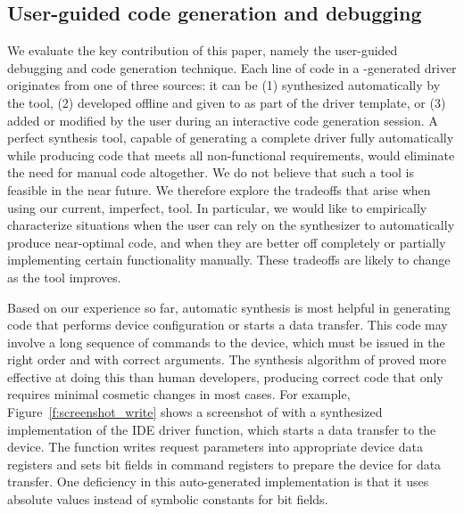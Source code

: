 
\subsection{User-guided code generation and debugging} 
We evaluate the key contribution of this paper, namely the user-guided debugging and code generation technique.  Each line of code in a \termite-generated driver originates from one of three sources: it can be (1) synthesized automatically by the tool, (2) developed offline and given to \termite as part of the driver template, or (3) added or modified by the user during an interactive code generation session.  A perfect synthesis tool, capable of generating a complete driver fully automatically while producing code that meets all non-functional requirements, would eliminate the need for manual code altogether.  We do not believe that such a tool is feasible in the near future.  We therefore explore the tradeoffs that arise when using our current, imperfect, tool.  In particular, we would like to empirically characterize situations when the user can rely on the synthesizer to automatically produce near-optimal code, and when they are better off completely or partially implementing certain functionality manually.  These tradeoffs are likely to change as the tool improves.

Based on our experience so far, automatic synthesis is most helpful in generating code that performs device configuration or starts a data transfer.  This code may involve a long sequence of commands to the device, which must be issued in the right order and with correct arguments.  The synthesis algorithm of \termite proved more effective at doing this than human developers, producing correct code that only requires minimal cosmetic changes in most cases.  For example, Figure~\ref{f:screenshot_write} shows a screenshot of \termite with a synthesized implementation of the IDE driver  function, which starts a data transfer to the device.  The function writes request parameters into appropriate device data registers and sets bit fields in command registers to prepare the device for data transfer.  One deficiency in this auto-generated implementation is that it uses absolute values instead of symbolic constants for bit fields.

